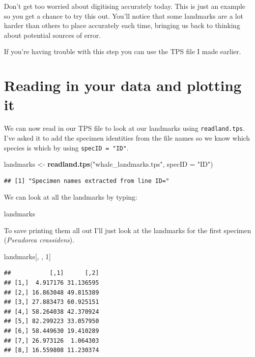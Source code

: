 \documentclass[]{book}
\newenvironment{Shaded}{\begin{snugshade}}{\end{snugshade}}
\newcommand{\KeywordTok}[1]{\textcolor[rgb]{0.13,0.29,0.53}{\textbf{{#1}}}}
\newcommand{\DataTypeTok}[1]{\textcolor[rgb]{0.13,0.29,0.53}{{#1}}}
\newcommand{\DecValTok}[1]{\textcolor[rgb]{0.00,0.00,0.81}{{#1}}}
\newcommand{\StringTok}[1]{\textcolor[rgb]{0.31,0.60,0.02}{{#1}}}
\newcommand{\NormalTok}[1]{{#1}}
\begin{document}
Don't get too worried about digitising accurately today. This is just an
example so you get a chance to try this out. You'll notice that some
landmarks are a lot harder than others to place accurately each time,
bringing us back to thinking about potential sources of error.

If you're having trouble with this step you can use the TPS file I made
earlier.

\section{Reading in your data and plotting
it}\label{reading-in-your-data-and-plotting-it}

We can now read in our TPS file to look at our landmarks using
\texttt{readland.tps}. I've asked it to add the specimen identities from
the file names so we know which species is which by using
\texttt{specID\ =\ "ID"}.

\begin{Shaded}
\begin{Highlighting}[]
\NormalTok{landmarks <-}\StringTok{ }\KeywordTok{readland.tps}\NormalTok{(}\StringTok{"whale_landmarks.tps"}\NormalTok{, }\DataTypeTok{specID =} \StringTok{"ID"}\NormalTok{)}
\end{Highlighting}
\end{Shaded}

\begin{verbatim}
## [1] "Specimen names extracted from line ID="
\end{verbatim}

We can look at all the landmarks by typing:

\begin{Shaded}
\begin{Highlighting}[]
\NormalTok{landmarks}
\end{Highlighting}
\end{Shaded}

To save printing them all out I'll just look at the landmarks for the
first specimen (\emph{Pseudorca crassidens}).

\begin{Shaded}
\begin{Highlighting}[]
\NormalTok{landmarks[, , }\DecValTok{1}\NormalTok{]}
\end{Highlighting}
\end{Shaded}

\begin{verbatim}
##           [,1]      [,2]
## [1,]  4.917176 31.136595
## [2,] 16.863048 49.815389
## [3,] 27.883473 60.925151
## [4,] 58.264038 42.370924
## [5,] 82.299223 33.057950
## [6,] 58.449630 19.410289
## [7,] 26.973126  1.064303
## [8,] 16.559808 11.230374
\end{verbatim}
\end{document}
